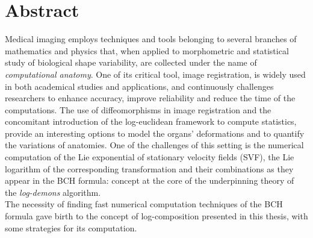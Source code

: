 \section*{Abstract}

Medical imaging employs techniques and tools belonging to several branches of mathematics and physics that, when applied to morphometric and statistical study of biological shape variability, are collected under the name of \emph{computational anatomy}. 
One of its critical tool, image registration, is widely used in both academical studies and applications, and continuously challenges researchers to enhance accuracy, improve reliability and reduce the time of the computations. The use of diffeomorphisms in image registration and the concomitant introduction of the log-euclidean framework to compute statistics, provide an interesting options to model the organs' deformations and to quantify the variations of anatomies.
One of the challenges of this setting is the numerical computation of the Lie exponential of stationary velocity fields (SVF), the Lie logarithm of the corresponding transformation and their combinations as they appear in the BCH formula: concept at the core of the underpinning theory of the \emph{log-demons} algorithm.\\
The necessity of finding fast numerical computation techniques of the BCH formula gave birth to the concept of log-composition presented in this thesis, with some strategies for its computation.





